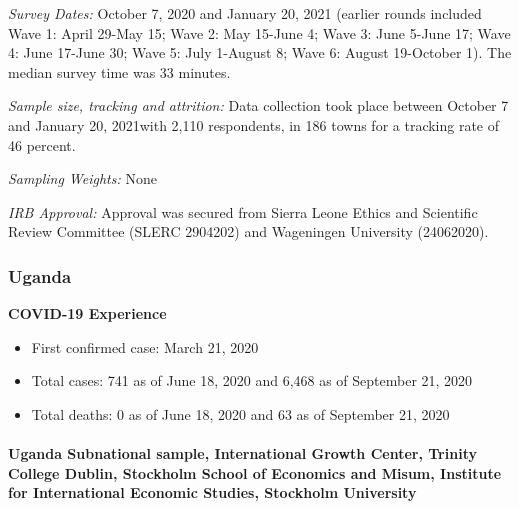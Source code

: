 \documentclass[
  12pt,
]{article}
\begin{document}
\emph{Survey Dates:} October 7, 2020 and January 20, 2021 (earlier rounds included Wave 1: April 29-May 15; Wave 2: May 15-June 4; Wave 3: June 5-June 17; Wave 4: June 17-June 30; Wave 5: July 1-August 8; Wave 6: August 19-October 1). The median survey time was 33 minutes.

\emph{Sample size, tracking and attrition:} Data collection took place between October 7 and January 20, 2021with 2,110 respondents, in 186 towns for a tracking rate of 46 percent.

\emph{Sampling Weights:} None

\emph{IRB Approval:} Approval was secured from Sierra Leone Ethics and Scientific Review Committee (SLERC 2904202) and Wageningen University (24062020).

\hypertarget{uganda}{%
\subsubsection*{Uganda}\label{uganda}}

\textbf{COVID-19 Experience}

\begin{itemize}
        \item First confirmed case: March 21, 2020
        \item Total cases:  741 as of June 18, 2020 and 6,468 as of September 21, 2020         \item Total deaths:  0 as of June 18, 2020 and 63 as of September 21, 2020 
\end{itemize}

\hypertarget{uganda-subnational-sample-international-growth-center-trinity-college-dublin-stockholm-school-of-economics-and-misum-institute-for-international-economic-studies-stockholm-university}{%
\paragraph*{Uganda Subnational sample, International Growth Center, Trinity College Dublin, Stockholm School of Economics and Misum, Institute for International Economic Studies, Stockholm University}\label{uganda-subnational-sample-international-growth-center-trinity-college-dublin-stockholm-school-of-economics-and-misum-institute-for-international-economic-studies-stockholm-university}}
\end{document}
